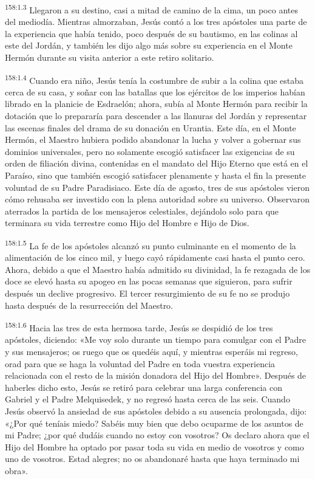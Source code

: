 \par
\textsuperscript{158:1.3} Llegaron a su destino, casi a mitad de camino de la cima, un poco antes del mediodía. Mientras almorzaban, Jesús contó a los tres apóstoles una parte de la experiencia que había tenido, poco después de su bautismo, en las colinas al este del Jordán, y también les dijo algo más sobre su experiencia en el Monte Hermón durante su visita anterior a este retiro solitario.

\par
\textsuperscript{158:1.4} Cuando era niño, Jesús tenía la costumbre de subir a la colina que estaba cerca de su casa, y soñar con las batallas que los ejércitos de los imperios habían librado en la planicie de Esdraelón; ahora, subía al Monte Hermón para recibir la dotación que lo prepararía para descender a las llanuras del Jordán y representar las escenas finales del drama de su donación en Urantia. Este día, en el Monte Hermón, el Maestro hubiera podido abandonar la lucha y volver a gobernar sus dominios universales, pero no solamente escogió satisfacer las exigencias de su orden de filiación divina, contenidas en el mandato del Hijo Eterno que está en el Paraíso, sino que también escogió satisfacer plenamente y hasta el fin la presente voluntad de su Padre Paradisiaco. Este día de agosto, tres de sus apóstoles vieron cómo rehusaba ser investido con la plena autoridad sobre su universo. Observaron aterrados la partida de los mensajeros celestiales, dejándolo solo para que terminara su vida terrestre como Hijo del Hombre e Hijo de Dios.

\par
\textsuperscript{158:1.5} La fe de los apóstoles alcanzó su punto culminante en el momento de la alimentación de los cinco mil, y luego cayó rápidamente casi hasta el punto cero. Ahora, debido a que el Maestro había admitido su divinidad, la fe rezagada de los doce se elevó hasta su apogeo en las pocas semanas que siguieron, para sufrir después un declive progresivo. El tercer resurgimiento de su fe no se produjo hasta después de la resurrección del Maestro.

\par
\textsuperscript{158:1.6} Hacia las tres de esta hermosa tarde, Jesús se despidió de los tres apóstoles, diciendo: «Me voy solo durante un tiempo para comulgar con el Padre y sus mensajeros; os ruego que os quedéis aquí, y mientras esperáis mi regreso, orad para que se haga la voluntad del Padre en toda vuestra experiencia relacionada con el resto de la misión donadora del Hijo del Hombre». Después de haberles dicho esto, Jesús se retiró para celebrar una larga conferencia con Gabriel y el Padre Melquisedek, y no regresó hasta cerca de las seis. Cuando Jesús observó la ansiedad de sus apóstoles debido a su ausencia prolongada, dijo: «¿Por qué teníais miedo? Sabéis muy bien que debo ocuparme de los asuntos de mi Padre; ¿por qué dudáis cuando no estoy con vosotros? Os declaro ahora que el Hijo del Hombre ha optado por pasar toda su vida en medio de vosotros y como uno de vosotros. Estad alegres; no os abandonaré hasta que haya terminado mi obra».

